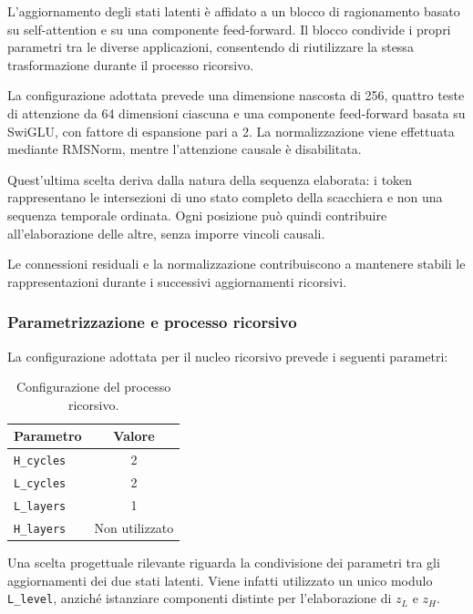 L'aggiornamento degli stati latenti è affidato a un blocco di ragionamento basato su self-attention e su una componente feed-forward. Il blocco condivide i propri parametri tra le diverse applicazioni, consentendo di riutilizzare la stessa trasformazione durante il processo ricorsivo.

La configurazione adottata prevede una dimensione nascosta di 256, quattro teste di attenzione da 64 dimensioni ciascuna e una componente feed-forward basata su SwiGLU, con fattore di espansione pari a 2. La normalizzazione viene effettuata mediante RMSNorm, mentre l'attenzione causale è disabilitata.

Quest'ultima scelta deriva dalla natura della sequenza elaborata: i token rappresentano le intersezioni di uno stato completo della scacchiera e non una sequenza temporale ordinata.
Ogni posizione può quindi contribuire all'elaborazione delle altre, senza imporre vincoli causali.

Le connessioni residuali e la normalizzazione contribuiscono a mantenere stabili le rappresentazioni durante i successivi aggiornamenti ricorsivi.

\subsubsection{Parametrizzazione e processo ricorsivo}

La configurazione adottata per il nucleo ricorsivo prevede i seguenti parametri:

\begin{table}[H]
    \centering
    \begin{tabular}{l|c}
        \textbf{Parametro} & \textbf{Valore} \\
        \hline
        \texttt{H\_cycles} & 2               \\
        \texttt{L\_cycles} & 2               \\
        \texttt{L\_layers} & 1               \\
        \texttt{H\_layers} & Non utilizzato
    \end{tabular}
    \caption{Configurazione del processo ricorsivo.}
    \label{tab:recursive_core_config}
\end{table}

Una scelta progettuale rilevante riguarda la condivisione dei parametri tra gli aggiornamenti dei due stati latenti. Viene infatti utilizzato un unico modulo \texttt{L\_level}, anziché istanziare componenti distinte per l'elaborazione di $z_L$ e $z_H$.

